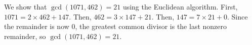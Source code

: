 We show that $\gcd(1071, 462) = 21$ using the Euclidean algorithm.
First, $1071 = 2 \times 462 + 147$.
Then, $462 = 3 \times 147 + 21$.
Then, $147 = 7 \times 21 + 0$.
Since the remainder is now $0$, the greatest common divisor is the last
nonzero remainder, so $\gcd(1071, 462) = 21$.
